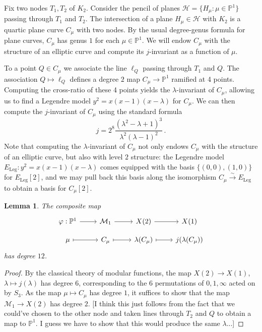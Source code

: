 \documentclass[reqno, 12pt]{amsart}
\newtheorem{lem}{Lemma}
\theoremstyle{definition}
\theoremstyle{remark}
\renewcommand{\P}{\mathbb P}
\newcommand{\sss}[1]{{\color{blue} [#1]}}
\begin{document}
Fix two nodes $T_1, T_2$ of $K_2$. Consider the pencil of planes $\mathcal{H} = \{H_\mu : \mu \in \P^1\}$ passing through $T_1$ and $T_2$. The intersection of a plane $H_\mu \in \mathcal{H}$ with $K_2$ is a quartic plane curve $C_\mu$ with two nodes. By the usual degree-genus formula for plane curves, $C_\mu$ has genus $1$ for each $\mu \in \P^1$. We will endow $C_\mu$ with the structure of an elliptic curve and compute its $j$-invariant as a function of $\mu$.

To a point $Q \in C_\mu$ we associate the line $\ell_Q$ passing through $T_1$ and $Q$. The association $Q \mapsto \ell_Q$ defines a degree $2$ map $C_\mu \to \P^1$ ramified at 4 points. Computing the cross-ratio of these 4 points yields the $\lambda$-invariant of $C_\mu$, allowing us to find a Legendre model $y^2 = x(x-1)(x-\lambda)$ for $C_\mu$. We can then compute the $j$-invariant of $C_\mu$ using the standard formula
$$
j = 2^8 \frac{(\lambda^2 - \lambda + 1)^3}{\lambda^2 (\lambda-1)^2}  \, .
$$
Note that computing the $\lambda$-invariant of $C_\mu$ not only endows $C_\mu$ with the structure of an elliptic curve, but also with level $2$ structure: the Legendre model $E_\text{Leg}: y^2 = x(x-1)(x-\lambda)$ comes equipped with the basis $\{(0,0), (1,0)\}$ for $E_\text{Leg}[2]$, and we may pull back this basis along the isomorphism $C_\mu \overset{\sim}{\to} E_\text{Leg}$ to obtain a basis for $C_\mu[2]$.
\begin{lem}
The composite map
%
$$
\begin{tikzcd}[row sep = small]
\varphi: \P^1 \ar[]{r}{} & \mathcal{M}_1 \ar[]{r}{} & X(2) \ar[]{r}{} & X(1)\\ 
\mu \ar[mapsto]{r}{} & C_\mu \ar[mapsto]{r}{} & \lambda(C_\mu) \ar[mapsto]{r}{} & j(\lambda(C_\mu))
\end{tikzcd}
$$
has degree $12$.
\end{lem}

\begin{proof}
By the classical theory of modular functions, the map $X(2) \to X(1)$, $\lambda \mapsto j(\lambda)$ has degree $6$, corresponding to the $6$ permutations of $0, 1, \infty$ acted on by $S_3$. As the map $\mu \mapsto C_\mu$ has degree $1$, it suffices to show that the map $\mathcal{M}_1 \to X(2)$ has degree $2$. \sss{I think this just follows from the fact that we could've chosen to the other node and taken lines through $T_2$ and $Q$ to obtain a map to $\P^1$. I guess we have to show that this would produce the same $\lambda$...}
\end{proof}
\end{document}
